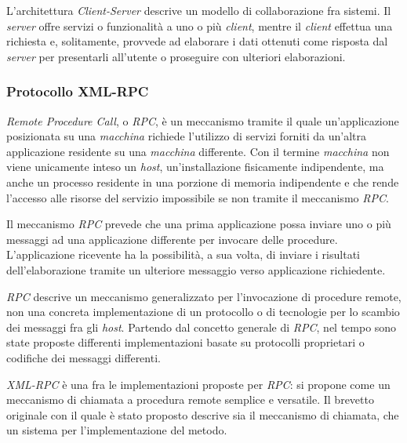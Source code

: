 L'architettura \emph{Client-Server} descrive un modello di collaborazione fra sistemi. Il \emph{server} offre servizi o funzionalità a uno o più \emph{client}, mentre il \emph{client} effettua una richiesta e, solitamente, provvede ad elaborare i dati ottenuti come risposta dal \emph{server} per presentarli all'utente o proseguire con ulteriori elaborazioni.

\subsubsection{Protocollo XML-RPC}\label{par:xmlrpc}

\emph{Remote Procedure Call}, o \emph{RPC}, è un meccanismo tramite il quale un'applicazione posizionata su una \emph{macchina} richiede l'utilizzo di servizi forniti da un'altra applicazione residente su una \emph{macchina} differente. Con il termine \emph{macchina} non viene unicamente inteso un \emph{host}, un'installazione fisicamente indipendente, ma anche un processo residente in una porzione di memoria indipendente e che rende l'accesso alle risorse del servizio impossibile se non tramite il meccanismo \emph{RPC}. 

Il meccanismo \emph{RPC} prevede che una prima applicazione possa inviare uno o più messaggi ad una applicazione differente per invocare delle procedure. L'applicazione ricevente ha la possibilità,  a sua volta, di inviare i risultati dell'elaborazione tramite un ulteriore messaggio verso applicazione richiedente.~\cite{MERRICK:2006:misc}

\emph{RPC} descrive un meccanismo generalizzato per l'invocazione di procedure remote, non una concreta implementazione di un protocollo o di tecnologie per lo scambio dei messaggi fra gli \emph{host}. Partendo dal concetto generale di \emph{RPC}, nel tempo sono state proposte differenti implementazioni basate su protocolli proprietari o codifiche dei messaggi differenti.~\cite{JAIRATH:2004:misc}~\cite{dcerpc}

\emph{XML-RPC} è una fra le implementazioni proposte per \emph{RPC}: si propone come un meccanismo di chiamata a procedura remote semplice e versatile. Il brevetto originale con il quale è stato proposto descrive sia il meccanismo di chiamata, che un sistema per l'implementazione del metodo.~\cite{MERRICK:2006:misc}

